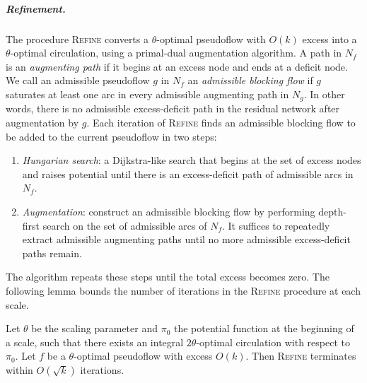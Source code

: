 \documentclass[a4paper,UKenglish]{socg-lipics-v2019}
\theoremstyle{plain}
\numberwithin{figure}{section}
\renewcommand{\paragraph}{\subparagraph}
\def\EMPH#1{\textcolor{BrickRed}{{\emph{#1}}}}
\begin{document}
\paragraph{Refinement.}
The procedure \textsc{Refine} converts a $\theta$-optimal pseudoflow with
$O(k)$ excess into a $\theta$-optimal circulation, using a primal-dual
augmentation algorithm.
A path in $N_f$ is an \EMPH{augmenting path} if it begins at an excess node
and ends at a deficit node.
We call an admissible pseudoflow $g$ in $N_f$ an
\EMPH{admissible blocking flow} if $g$ saturates at least one arc in every
admissible augmenting path in $N_g$.
In other words, there is no admissible excess-deficit path in the residual
network after augmentation by $g$.
Each iteration of \textsc{Refine} finds an admissible blocking flow to be added
to the current pseudoflow in two steps:
\begin{enumerate}
\item
\EMPH{Hungarian search}: a Dijkstra-like search that begins at the set of
excess nodes and raises potential until there is an excess-deficit path
of admissible arcs in $N_f$.
\item
\EMPH{Augmentation}: construct an admissible blocking flow by performing
depth-first search on the set of admissible arcs of $N_f$.
It suffices to repeatedly extract admissible augmenting paths until no more
admissible excess-deficit paths remain.
\end{enumerate}
The algorithm repeats these steps until the total excess becomes zero.
The following lemma bounds the number of iterations in the \textsc{Refine}
procedure at each scale.

\begin{lemma}
\label{lemma:refine_iters}
Let $\theta$ be the scaling parameter and $\pi_0$ the potential function at the
beginning of a scale, such that there exists an integral $2\theta$-optimal
circulation with respect to $\pi_0$.
Let $f$ be a $\theta$-optimal pseudoflow with excess $O(k)$.
Then \textsc{Refine} terminates within $O(\sqrt{k})$ iterations.
\end{lemma}
\end{document}
